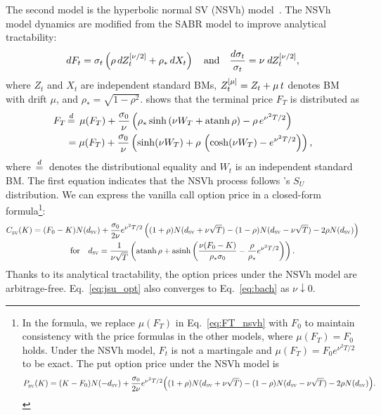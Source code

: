 \documentclass[a4paper,review]{elsarticle}
\newcommand{\sv}{\textsc{sv}}
\newcommand{\vov}{\nu}
\newcommand{\rhoc}{\rho_\ast}
\newcommand{\distequal}{\,{\buildrel d \over =}\,}
\newcommand{\Zdrift}[1][\mu]{\ifthenelse{\equal{#1}{0}}{Z}{Z^{[#1]}}}
\newcommand{\asinh}{\mathrm{asinh}}
\newcommand{\atanh}{\mathrm{atanh}}
\newcommand{\Call}[2]{C_\textsc{#1}^\textsc{#2}}
\newcommand{\Put}[2]{P_\textsc{#1}^\textsc{#2}}
\begin{document}
The second model is the hyperbolic normal SV (NSVh) model~\citep{choi2019nsvh}. The NSVh model dynamics are modified from the SABR model to improve 
analytical tractability:
\begin{equation}
	dF_t = \sigma_t \left(\rho\,d\Zdrift[\vov/2]_t + \rhoc\,dX_t\right) \quad \text{and}\quad
	\frac{d\sigma_t}{\sigma_t} = \vov\; d\Zdrift[\vov/2]_t,
\end{equation}
where $Z_t$ and $X_t$ are independent standard BMs, $\Zdrift_t = Z_t + \mu\, t$ denotes BM with drift $\mu$, and $\rhoc = \sqrt{1-\rho^2}$. \citet{choi2019nsvh} shows that the terminal price $F_T$ is distributed as
\begin{equation}\label{eq:FT_nsvh}
\begin{aligned}
	F_T &\distequal\; \mu(F_T) + \frac{\sigma_0}{\vov}\left(\rhoc \sinh\left( \vov W_T + \atanh\, \rho\right) - \rho\, e^{\vov^2 T/2}\right) \\
	&= \mu(F_T) + \frac{\sigma_0}{\vov}\left( \sinh(\vov W_T) + \rho\,\left(\cosh(\vov W_T) - e^{\vov^2 T/2}\right) \right), 
\end{aligned}
\end{equation}
where $\distequal$ denotes the distributional equality and $W_t$ is an independent standard BM. The first equation indicates that the NSVh process follows \citet{johnson1949systems}'s $S_U$ distribution. We can express the vanilla call option price in a closed-form formula\footnote{In the formula, we replace $\mu(F_T)$ in Eq.~\eqref{eq:FT_nsvh} with $F_0$ to maintain consistency with the price formulas in the other models, where $\mu(F_T)=F_0$ holds. Under the NSVh model, $F_t$ is not a martingale and $ \mu(F_T) = F_0 e^{\vov^2 T/2}$ to be exact. The put option price under the NSVh model is
$$\Put{sv}{}(K) = (K - F_0) N(-d_\sv) + \frac{\sigma_0}{2\vov} e^{\vov^2 T/2} \Big((1+\rho)N(d_\sv+\vov\sqrt{T}) - (1-\rho)N(d_\sv-\vov\sqrt{T})-2\rho N(d_\sv)\Big).
$$}:
\begin{equation} \label{eq:jsu_opt}
\begin{gathered}
	\Call{sv}{}(K) = (F_0-K) N(d_\sv) + \frac{\sigma_0}{2\vov} e^{\vov^2 T/2} \left((1+\rho)N(d_\sv+\vov\sqrt{T}) - (1-\rho)N(d_\sv-\vov\sqrt{T})-2\rho N(d_\sv)\right)\\
	\text{for}\quad d_\sv = \frac{1}{\vov\sqrt{T}}\left( \atanh\,\rho + \asinh\left( 
\frac{\vov(F_0-K)}{\rhoc\sigma_0} - \frac{\rho}{\rhoc} e^{\vov^2 T/2} 
\right) \right).
\end{gathered}
\end{equation}
Thanks to its analytical tractability, the option prices under the NSVh model are arbitrage-free. Eq.~\eqref{eq:jsu_opt} also converges to Eq.~\eqref{eq:bach} as $\vov\downarrow 0$.
\end{document}
